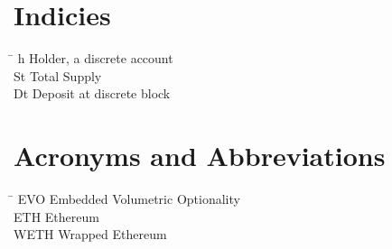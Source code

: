 		
		\section*{Indicies}
		\begin{tabbing}
			\hspace*{1.6cm}  \= \kill
			h \> Holder, a discrete account \\[0.5ex]
			St \> Total Supply \\[0.5ex]
			Dt \> Deposit at discrete block
		\end{tabbing}
		
		\section*{Acronyms and Abbreviations}
		\begin{tabbing}
			\hspace*{1.6cm}  \= \kill
			EVO \> Embedded Volumetric Optionality \\[0.5ex]
			ETH \> Ethereum \\[0.5ex]
			WETH \> Wrapped Ethereum
		\end{tabbing}
		
		\cleardoublepage
		
